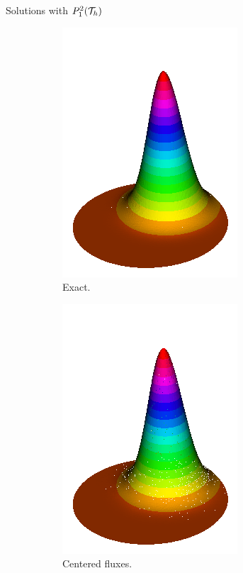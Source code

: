 \begin{frame}{Solutions with $\relax{P}_1^2(\mathcal{T}_h)$}
\begin{figure}[h!]
\begin{subfigure}[b]{0.27\textwidth}
				\includegraphics[scale=0.22]{img/Conveccion_Reaccion/Recortes/steady_convect_react_exact_n_256.png}
				\caption{Exact.}
			\end{subfigure}
			\begin{subfigure}[b]{0.27\textwidth}
				\centering
				\includegraphics[scale=0.22]{img/Conveccion_Reaccion/Recortes/steady_convect_react_approx_CF_n_256.png}
				\caption{Centered fluxes.}
			\end{subfigure}
			\begin{subfigure}[b]{0.27\textwidth}
				\centering

\end{subfigure}
\end{figure}
\end{frame}
